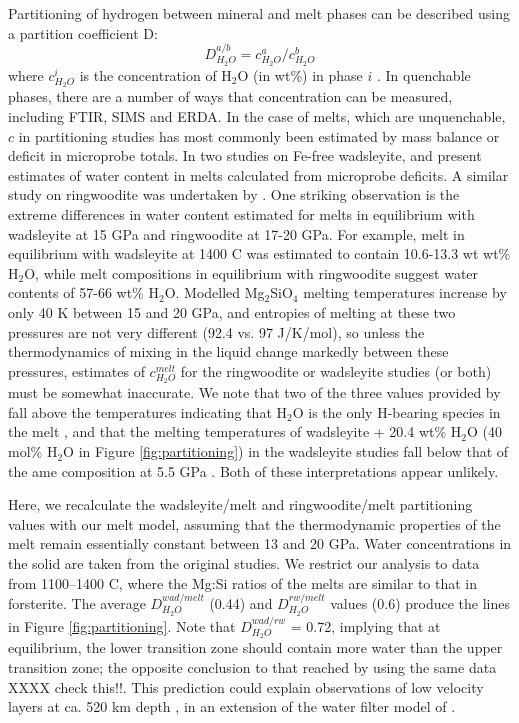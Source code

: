 \documentclass[review]{elsarticle}
\begin{document}
Partitioning of hydrogen between mineral and melt phases can be described using a partition coefficient D:
\begin{equation}
  D^{a/b}_{H_2O} = c^a_{H_2O} / c^b_{H_2O}
\end{equation}
where $c^i_{H_2O}$ is the concentration of H$_2$O (in wt\%) in phase $i$ \citep{KB2006}. In quenchable phases, there are a number of ways that concentration can be measured, including FTIR, SIMS and ERDA. In the case of melts, which are unquenchable, $c$ in partitioning studies has most commonly been estimated by mass balance or deficit in microprobe totals. In two studies on Fe-free wadsleyite, \cite{DDFK2005} and  \cite{LSOK2011} present estimates of water content in melts calculated from microprobe deficits. A similar study on ringwoodite was undertaken by \cite{OMY2000}. One striking observation is the extreme differences in water content estimated for melts in equilibrium with wadsleyite at 15 GPa and ringwoodite at 17-20 GPa. For example, melt in equilibrium with wadsleyite at 1400 C was estimated to contain 10.6-13.3 wt wt\% H$_2$O, while melt compositions in equilibrium with ringwoodite suggest water contents of 57-66 wt\% H$_2$O. Modelled Mg$_2$SiO$_4$ melting temperatures increase by only 40 K between 15 and 20 GPa, and entropies of melting at these two pressures are not very different (92.4 vs. 97 J/K/mol), so unless the thermodynamics of mixing in the liquid change markedly between these pressures, estimates of $c^{melt}_{H_2O}$ for the ringwoodite or wadsleyite studies (or both) must be somewhat inaccurate. We note that two of the three values provided by \cite{OMY2000} fall above the temperatures indicating that H$_2$O is the only H-bearing species in the melt \citep{SS1985}, and that the melting temperatures of wadsleyite + 20.4 wt\% H$_2$O (40 mol\% H$_2$O in Figure \ref{fig:partitioning}) in the wadsleyite studies fall below that of the ame composition at 5.5 GPa \citep{Inoue1994}. Both of these interpretations appear unlikely.

Here, we recalculate the wadsleyite/melt and ringwoodite/melt partitioning values with our melt model, assuming that the thermodynamic properties of the melt remain essentially constant between 13 and 20 GPa. Water concentrations in the solid are taken from the original studies. We restrict our analysis to data from 1100--1400 C, where the Mg:Si ratios of the melts are similar to that in forsterite. The average $D^{wad/melt}_{H_2O}$ (0.44) and $D^{rw/melt}_{H_2O}$ values (0.6) produce the lines in Figure \ref{fig:partitioning}. Note that $D^{wad/rw}_{H_2O}$ = 0.72, implying that at equilibrium, the lower transition zone should contain more water than the upper transition zone; the opposite conclusion to that reached by \cite{DDFK2005} using the same data XXXX check this!!. This prediction could explain observations of low velocity layers at ca. 520 km depth \citep{JDH2010}, in an extension of the water filter model of \cite{BK2003}.
\end{document}
